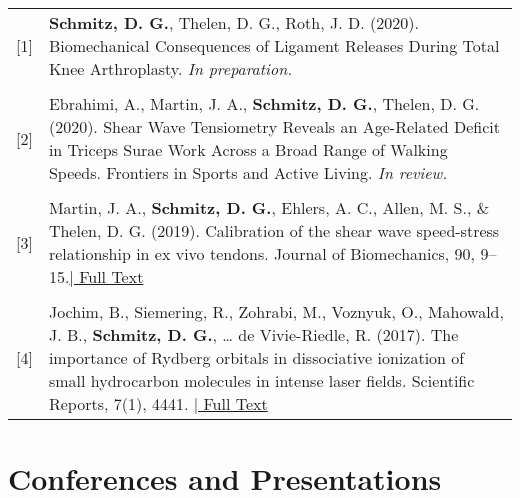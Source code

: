 \documentclass[a4paper,10pt]{article} %
\begin{document}
\begin{tabular}{rp{13cm}}
{[1]} & \textbf{Schmitz, D. G.}, Thelen, D. G., Roth, J. D. (2020). Biomechanical Consequences of Ligament Releases During Total Knee Arthroplasty. \emph{In preparation.} \\
\\
{[2]} & Ebrahimi, A., Martin, J. A., \textbf{Schmitz, D. G.}, Thelen, D. G. (2020). Shear Wave Tensiometry Reveals an Age-Related Deficit in Triceps Surae Work Across a Broad Range of Walking Speeds. Frontiers in Sports and Active Living. \emph{In review.} \\
\\
{[3]} & Martin, J. A., \textbf{Schmitz, D. G.}, Ehlers, A. C., Allen, M. S., \& Thelen, D. G. (2019). Calibration of the shear wave speed-stress relationship in ex vivo tendons. Journal of Biomechanics, 90, 9–15.\hyperlink{https://doi.org/10.1016/j.jbiomech.2019.04.015}{\hfill | \footnotesize Full Text} \\
\\
{[4]} & Jochim, B., Siemering, R., Zohrabi, M., Voznyuk, O., Mahowald, J. B., \textbf{Schmitz, D. G.}, {\ldots} de Vivie-Riedle, R. (2017). The importance of Rydberg orbitals in dissociative ionization of small hydrocarbon molecules in intense laser fields. Scientific Reports, 7(1), 4441.
\hyperlink{https://doi.org/10.1038/s41598-017-04638-0}{\hfill | \footnotesize Full Text} \\
\end{tabular}


\section{Conferences and Presentations}

\end{document}
